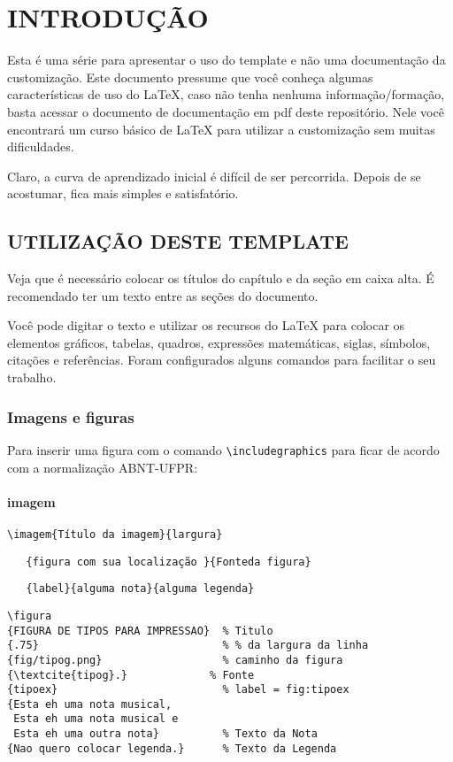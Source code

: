 \chapter{INTRODUÇÃO} \label{cha:introd}

Esta é uma série para apresentar o uso do template e não uma documentação da customização. Este documento pressume que você conheça algumas características de uso do LaTeX, caso não tenha nenhuma informação/formação, basta acessar o documento de documentação em pdf deste repositório. Nele você encontrará um curso básico de LaTeX para utilizar a customização sem muitas dificuldades.

Claro, a curva de aprendizado inicial é difícil de ser percorrida. Depois de se acostumar, fica mais simples e satisfatório.
\section{UTILIZAÇÃO DESTE TEMPLATE} \label{sec:util}

Veja que é necessário colocar os títulos do capítulo e da seção em caixa alta. É recomendado ter um texto entre as seções do documento.

Você pode digitar o texto e utilizar os recursos do LaTeX para colocar os elementos gráficos, tabelas, quadros, expressões matemáticas, siglas, símbolos, citações e referências. Foram configurados alguns comandos para facilitar o seu trabalho.
\subsection[Imagens]{Imagens e figuras}\label{ssec:imafig}

Para inserir uma figura com o comando \verb+\includegraphics+ para ficar de acordo com a normalização ABNT-UFPR:
\subsubsection{imagem}\label{sssec:imagem}

\verb+\imagem{Título da imagem}{largura}+ 

\verb+   {figura com sua localização }{Fonteda figura}+

\verb+   {label}{alguma nota}{alguma legenda}+

\begin{lstlisting}
\figura
{FIGURA DE TIPOS PARA IMPRESSAO}  % Titulo
{.75}                             % % da largura da linha
{fig/tipog.png}                   % caminho da figura
{\textcite{tipog}.}             % Fonte
{tipoex}                          % label = fig:tipoex
{Esta eh uma nota musical, 
 Esta eh uma nota musical e 
 Esta eh uma outra nota}          % Texto da Nota
{Nao quero colocar legenda.}      % Texto da Legenda
\end{lstlisting}

